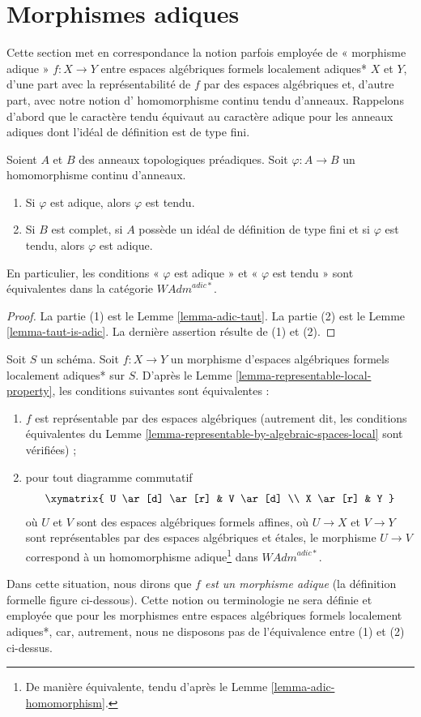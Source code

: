 \section{Morphismes adiques}
\label{section-adic}

\noindent
Cette section met en correspondance la notion parfois employée de
« morphisme adique » $f : X \to Y$ entre espaces algébriques formels localement adiques*
$X$ et $Y$, d'une part avec la représentabilité de $f$ par des
espaces algébriques et, d'autre part, avec notre notion d'
homomorphisme continu tendu d'anneaux. Rappelons d'abord que
le caractère tendu équivaut au caractère adique pour les anneaux adiques dont
l'idéal de définition est de type fini.

\begin{lemma}
\label{lemma-adic-homomorphism}
Soient $A$ et $B$ des anneaux topologiques préadiques. Soit
$\varphi : A \to B$ un homomorphisme continu d'anneaux.
\begin{enumerate}
\item Si $\varphi$ est adique, alors $\varphi$ est tendu.
\item Si $B$ est complet, si $A$ possède un idéal de définition
de type fini et si $\varphi$ est tendu, alors $\varphi$ est adique.
\end{enumerate}
En particulier, les conditions « $\varphi$ est adique » et « $\varphi$ est tendu »
sont équivalentes dans la catégorie $\textit{WAdm}^{adic*}$.
\end{lemma}

\begin{proof}
La partie (1) est le Lemme \ref{lemma-adic-taut}.
La partie (2) est le Lemme \ref{lemma-taut-is-adic}.
La dernière assertion résulte de (1) et (2).
\end{proof}

\noindent
Soit $S$ un schéma. Soit $f : X \to Y$ un morphisme d'espaces algébriques
formels localement adiques* sur $S$.
D'après le Lemme \ref{lemma-representable-local-property},
les conditions suivantes sont équivalentes :
\begin{enumerate}
\item $f$ est représentable par des espaces algébriques (autrement dit, les
conditions équivalentes du
Lemme \ref{lemma-representable-by-algebraic-spaces-local} sont vérifiées) ;
\item pour tout diagramme commutatif
$$
\xymatrix{
U \ar[d] \ar[r] & V \ar[d] \\
X \ar[r] & Y
}
$$
où $U$ et $V$ sont des espaces algébriques formels affines, où $U \to X$ et $V \to Y$
sont représentables par des espaces algébriques et étales, le morphisme $U \to V$
correspond à un homomorphisme adique\footnote{De manière équivalente, tendu d'après le
Lemme \ref{lemma-adic-homomorphism}.} dans $\textit{WAdm}^{adic*}$.
\end{enumerate}
Dans cette situation, nous dirons que {\it $f$ est un morphisme adique} (la définition
formelle figure ci-dessous). Cette notion ou terminologie ne sera définie et employée
que pour les morphismes entre espaces algébriques formels localement adiques*,
car, autrement, nous ne disposons pas de l'équivalence entre (1) et (2) ci-dessus.

